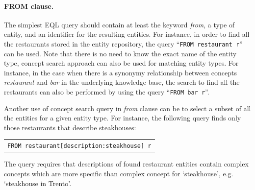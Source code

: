 \paragraph{FROM clause.}
The simplest EQL query should contain at least the keyword \emph{from}, a type of entity, and an identifier for the resulting entities. For instance, in order to find all the restaurants stored in the entity repository, the query ``\texttt{FROM restaurant r}'' can be used.
Note that there is no need to know the exact name of the entity type, concept search approach can also be used for matching entity types. For instance, in the case when there is a synonymy relationship between concepts \emph{restaurant} and \emph{bar} in the underlying knowledge base, the search to find all the restaurants can also be performed by using the query ``\texttt{FROM bar r}''.

Another use of concept search query in \emph{from} clause can be to select a subset of all the entities for a given entity type. For instance, the following query finds only those restaurants that describe steakhouses:
\begin{center}
\begin{tabular}{l}
\texttt{FROM restaurant[description:steakhouse] r} \\
\end{tabular}
\end{center}
The query requires that descriptions of found restaurant entities contain complex concepts which are more specific than complex concept for `steakhouse', e.g. `steakhouse in Trento'.

